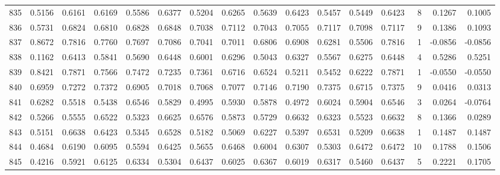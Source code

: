 \begin{tabular}{lrrrrrrrrrrrrrrr}
835 &      0.5156 &  0.6161 &  0.6169 &  0.5586 &  0.6377 &  0.5204 &  0.6265 &  0.5639 &  0.6423 &  0.5457 &   0.5449 &     0.6423 &      8 &                    0.1267 &                     0.1005 \\
836 &      0.5731 &  0.6824 &  0.6810 &  0.6828 &  0.6848 &  0.7038 &  0.7112 &  0.7043 &  0.7055 &  0.7117 &   0.7098 &     0.7117 &      9 &                    0.1386 &                     0.1093 \\
837 &      0.8672 &  0.7816 &  0.7760 &  0.7697 &  0.7086 &  0.7041 &  0.7011 &  0.6806 &  0.6908 &  0.6281 &   0.5506 &     0.7816 &      1 &                   -0.0856 &                    -0.0856 \\
838 &      0.1162 &  0.6413 &  0.5841 &  0.5690 &  0.6448 &  0.6001 &  0.6296 &  0.5043 &  0.6327 &  0.5567 &   0.6275 &     0.6448 &      4 &                    0.5286 &                     0.5251 \\
839 &      0.8421 &  0.7871 &  0.7566 &  0.7472 &  0.7235 &  0.7361 &  0.6716 &  0.6524 &  0.5211 &  0.5452 &   0.6222 &     0.7871 &      1 &                   -0.0550 &                    -0.0550 \\
840 &      0.6959 &  0.7272 &  0.7372 &  0.6905 &  0.7018 &  0.7068 &  0.7077 &  0.7146 &  0.7190 &  0.7375 &   0.6715 &     0.7375 &      9 &                    0.0416 &                     0.0313 \\
841 &      0.6282 &  0.5518 &  0.5438 &  0.6546 &  0.5829 &  0.4995 &  0.5930 &  0.5878 &  0.4972 &  0.6024 &   0.5904 &     0.6546 &      3 &                    0.0264 &                    -0.0764 \\
842 &      0.5266 &  0.5555 &  0.6522 &  0.5323 &  0.6625 &  0.6576 &  0.5873 &  0.5729 &  0.6632 &  0.6323 &   0.5523 &     0.6632 &      8 &                    0.1366 &                     0.0289 \\
843 &      0.5151 &  0.6638 &  0.6423 &  0.5345 &  0.6528 &  0.5182 &  0.5069 &  0.6227 &  0.5397 &  0.6531 &   0.5209 &     0.6638 &      1 &                    0.1487 &                     0.1487 \\
844 &      0.4684 &  0.6190 &  0.6095 &  0.5594 &  0.6425 &  0.5655 &  0.6468 &  0.6004 &  0.6307 &  0.5303 &   0.6472 &     0.6472 &     10 &                    0.1788 &                     0.1506 \\
845 &      0.4216 &  0.5921 &  0.6125 &  0.6334 &  0.5304 &  0.6437 &  0.6025 &  0.6367 &  0.6019 &  0.6317 &   0.5460 &     0.6437 &      5 &                    0.2221 &                     0.1705 \\

\end{tabular}
